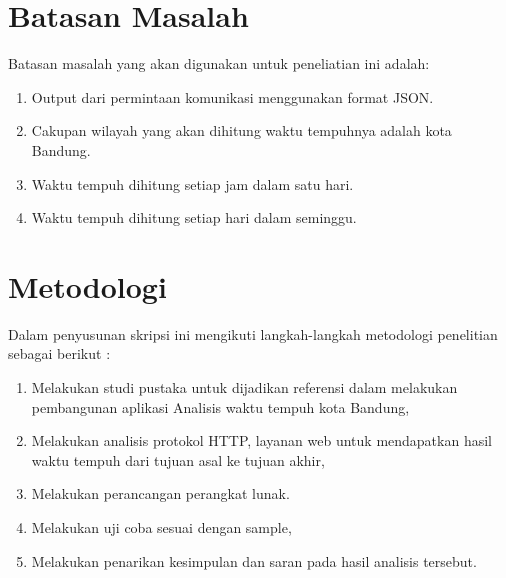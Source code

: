 \section{Batasan Masalah}
\label{sec:batasan}
Batasan masalah yang akan digunakan untuk peneliatian ini adalah:
\begin{enumerate}
	\item Output dari permintaan komunikasi menggunakan format JSON.
	\item Cakupan wilayah yang akan dihitung waktu tempuhnya adalah kota Bandung.
	\item Waktu tempuh dihitung setiap jam dalam satu hari.
	\item Waktu tempuh dihitung setiap hari dalam seminggu.
\end{enumerate}

\section{Metodologi}
\label{sec:metlit}
Dalam penyusunan skripsi ini mengikuti langkah-langkah metodologi penelitian sebagai berikut :
\begin{enumerate}
	\item Melakukan studi pustaka untuk dijadikan referensi dalam melakukan pembangunan aplikasi Analisis waktu tempuh kota Bandung,
	\item Melakukan analisis protokol HTTP, layanan web untuk mendapatkan hasil waktu tempuh dari tujuan asal ke tujuan akhir,
	\item Melakukan perancangan perangkat lunak.
	\item Melakukan uji coba sesuai dengan sample,
	\item Melakukan penarikan kesimpulan dan saran pada hasil analisis tersebut.
\end{enumerate}


